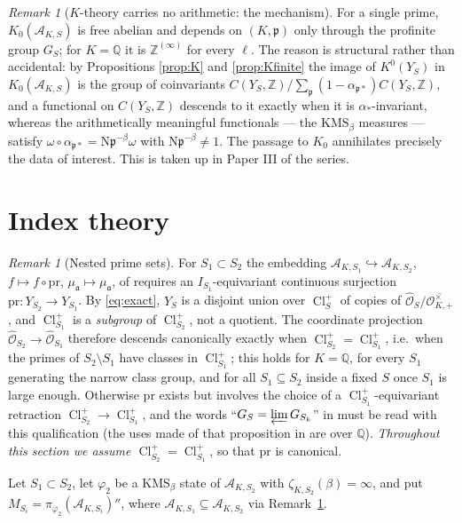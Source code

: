 \documentclass[11pt]{amsart}
\numberwithin{equation}{section}
\theoremstyle{definition}
\theoremstyle{remark}
\newtheorem{remark}[theorem]{Remark}
\newcommand{\Z}{\mathbb{Z}}
\newcommand{\Q}{\mathbb{Q}}
\newcommand{\cA}{\mathcal{A}}
\newcommand{\cO}{\mathcal{O}}
\newcommand{\hO}{\widehat{\cO}}
\newcommand{\pp}{\mathfrak{p}}
\newcommand{\aaa}{\mathfrak{a}}
\newcommand{\Ns}{\mathrm{N}}
\newcommand{\Cl}{\operatorname{Cl}}
\begin{document}
\begin{remark}[$K$-theory carries no arithmetic: the mechanism]\label{rem:noarith}
For a single prime, $K_0(\cA_{K,S})$ is free abelian and depends on $(K,\pp)$ only through
the profinite group $G_S$; for $K=\Q$ it is $\Z^{(\infty)}$ for every $\ell$. The reason
is structural rather than accidental: by Propositions \ref{prop:K} and \ref{prop:Kfinite}
the image of $K^0(Y_S)$ in $K_0(\cA_{K,S})$ is the group of coinvariants
$C(Y_S,\Z)/\sum_\pp(1-\alpha_{\pp*})C(Y_S,\Z)$, and a functional on $C(Y_S,\Z)$ descends
to it exactly when it is $\alpha_*$-invariant, whereas the arithmetically meaningful
functionals --- the $\mathrm{KMS}_\beta$ measures --- satisfy
$\omega\circ\alpha_{\pp*}=\Ns\pp^{-\beta}\omega$ with $\Ns\pp^{-\beta}\ne1$. The passage to
$K_0$ annihilates precisely the data of interest. This is taken up in Paper III of the
series.
\end{remark}

\section{Index theory}

\begin{remark}[Nested prime sets]\label{rem:embed}
For $S_1\subset S_2$ the embedding $\cA_{K,S_1}\hookrightarrow\cA_{K,S_2}$, $f\mapsto f\circ\mathrm{pr}$,
$\mu_\aaa\mapsto\mu_\aaa$, of \cite[Prop.~2.7]{Main} requires an $I_{S_1}$-equivariant
continuous surjection $\mathrm{pr}:Y_{S_2}\to Y_{S_1}$. By \eqref{eq:exact}, $Y_S$ is a
disjoint union over $\Cl^+_S$ of copies of $\hO_S/\overline{\cO^\times_{K,+}}$, and
$\Cl^+_{S_1}$ is a \emph{subgroup} of $\Cl^+_{S_2}$, not a quotient. The coordinate
projection $\hO_{S_2}\to\hO_{S_1}$ therefore descends canonically exactly when
$\Cl^+_{S_2}=\Cl^+_{S_1}$, i.e.\ when the primes of $S_2\setminus S_1$ have classes in
$\Cl^+_{S_1}$; this holds for $K=\Q$, for every $S_1$ generating the narrow class group,
and for all $S_1\subseteq S_2$ inside a fixed $S$ once $S_1$ is large enough. Otherwise
$\mathrm{pr}$ exists but involves the choice of a $\Cl^+_{S_1}$-equivariant retraction
$\Cl^+_{S_2}\to\Cl^+_{S_1}$, and the words ``$G_S=\varprojlim G_{S_k}$'' in
\cite[Prop.~2.7]{Main} must be read with this qualification (the uses made of that
proposition in \cite{Main} are over $\Q$). \emph{Throughout this section we assume
$\Cl^+_{S_2}=\Cl^+_{S_1}$}, so that $\mathrm{pr}$ is canonical.
\end{remark}

Let $S_1\subset S_2$, let $\varphi_2$ be a $\mathrm{KMS}_\beta$ state of $\cA_{K,S_2}$ with
$\zeta_{K,S_2}(\beta)=\infty$, and put $M_{S_i}=\pi_{\varphi_2}(\cA_{K,S_i})''$, where
$\cA_{K,S_1}\subseteq\cA_{K,S_2}$ via Remark~\ref{rem:embed}.
\end{document}
